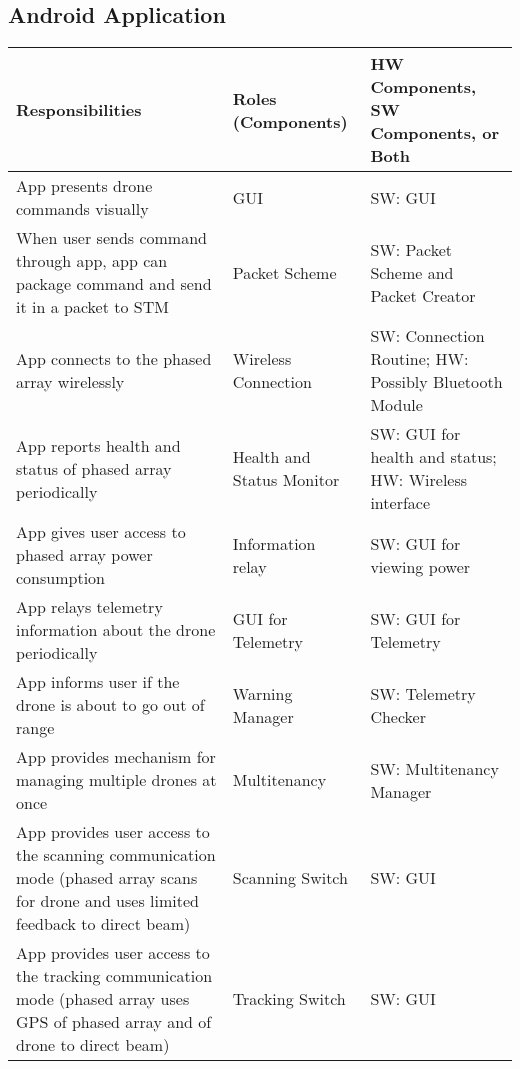 \documentclass[RRC.tex]{subfiles}
\begin{document}
\bigskip
\subsection{\Large Android Application}
\begin{center}
	\begin{tabular}{ | p{5cm} | p{5cm} | p{5cm} |}
		\hline
		Responsibilities & Roles (Components) & HW Components, SW Components, or Both \\ \hline
		App presents drone commands visually & GUI & SW: GUI \\ \hline
		When user sends command through app, app can package command and send it in a packet to STM & Packet Scheme & SW: Packet Scheme and Packet Creator \\ \hline
		App connects to the phased array wirelessly & Wireless Connection & SW: Connection Routine; HW: Possibly Bluetooth Module \\ \hline
		App reports health and status of phased array periodically & Health and Status Monitor & SW: GUI for health and status; HW: Wireless interface \\ \hline
		App gives user access to phased array power consumption & Information relay & SW: GUI for viewing power \\ \hline
		App relays telemetry information about the drone periodically & GUI for Telemetry & SW: GUI for Telemetry \\ \hline
		App informs user if the drone is about to go out of range & Warning Manager & SW: Telemetry Checker \\ \hline
		App provides mechanism for managing multiple drones at once & Multitenancy & SW: Multitenancy Manager \\ \hline
		App provides user access to the scanning communication mode (phased array scans for drone and uses limited feedback to direct beam) & Scanning Switch & SW: GUI \\ \hline
		App provides user access to the tracking communication mode (phased array uses GPS of phased array and of drone to direct beam) & Tracking Switch & SW: GUI \\ \hline
		
	\end{tabular}
\end{center}
\end{document}
